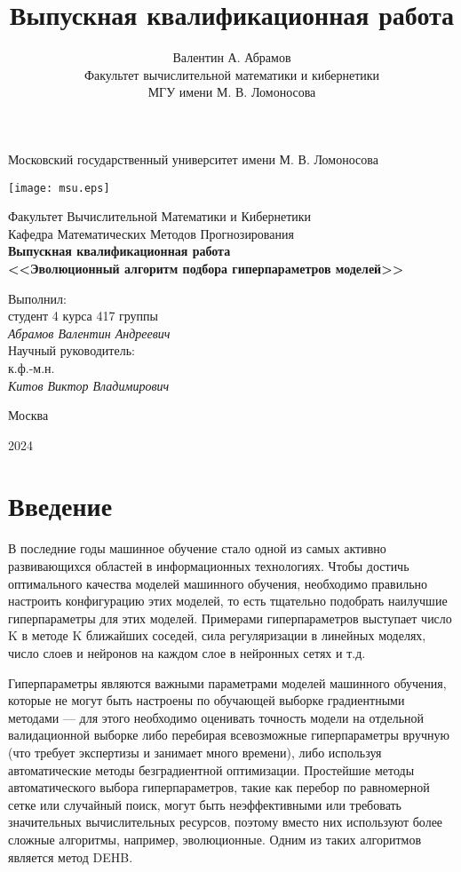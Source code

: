 \documentclass[a4paper,12pt]{article}
\title{Выпускная квалификационная работа}
\author{ Валентин А. Абрамов \\
	Факультет вычислительной математики и кибернетики\\
	МГУ имени М. В. Ломоносова\\
}
\date{}
\begin{document}
\begin{titlepage}
\begin{center}
    Московский государственный университет имени М. В. Ломоносова

    \bigskip
    \texttt{[image: msu.eps]}

    \bigskip
    Факультет Вычислительной Математики и Кибернетики\\
    Кафедра Математических Методов Прогнозирования\\[10mm]

    \textsf{\large\bfseries
         Выпускная квалификационная работа\\[10mm]
        <<Эволюционный алгоритм подбора гиперпараметров моделей>>
    }\\[10mm]

    \begin{flushright}
        \parbox{0.5\textwidth}{
            Выполнил:\\
            студент 4 курса 417 группы\\
            \emph{Абрамов Валентин Андреевич}\\[5mm]
            Научный руководитель:\\
            к.ф.-м.н.\\
            \emph{Китов Виктор Владимирович}
        }
    \end{flushright}

    \vspace{\fill}
    Москва
    
    2024
\end{center}
\end{titlepage}
\tableofcontents
\newpage

\section{Введение}

В последние годы машинное обучение стало одной из самых активно 
развивающихся областей в информационных технологиях. Чтобы достичь 
оптимального качества моделей машинного обучения, необходимо правильно 
настроить конфигурацию этих моделей, то есть тщательно подобрать 
наилучшие гиперпараметры для этих моделей.
Примерами гиперпараметров выступает число K в методе K ближайших 
соседей, сила регуляризации в линейных моделях, число слоев и нейронов на 
каждом слое в нейронных сетях и т.д.

Гиперпараметры являются важными параметрами моделей машинного 
обучения, которые не могут быть настроены по обучающей выборке 
градиентными методами — для этого необходимо оценивать точность модели 
на отдельной валидационной выборке либо перебирая всевозможные 
гиперпараметры вручную (что требует экспертизы и занимает много времени), 
либо используя автоматические методы безградиентной оптимизации. 
Простейшие методы автоматического выбора гиперпараметров, такие как 
перебор по равномерной сетке или случайный поиск, могут быть 
неэффективными или требовать значительных вычислительных ресурсов, 
поэтому вместо них используют более сложные алгоритмы, например, 
эволюционные.  Одним из таких алгоритмов является метод DEHB.
\end{document}
